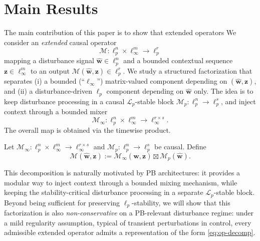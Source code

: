 \documentclass[journal,twoside,web]{ieeecolor}
\newcommand{\disturbance}{\mathbf{\widehat w}}
\newcommand{\operator}{\mathcal{M}}
\begin{document}

\section{Main Results}
The main contribution of this paper is to show that extended operators
We consider an \emph{extended} causal operator
\[
\operator:\ell_p^n\times \ell_\infty^m\to \ell_p^r
\]
mapping a disturbance signal \(\disturbance\in\ell_p^n\) and a bounded contextual sequence
\(\mathbf z\in\ell_\infty^m\) to an output \(\operator(\disturbance,\mathbf z)\in\ell_p^r\).
We study a structured factorization that separates
(i) a bounded (``\(\ell_\infty\)'') matrix-valued component depending on \((\disturbance,\mathbf z)\),
and
(ii) a disturbance-driven \(\ell_p\) component depending on \(\disturbance\) only.
The idea is to keep disturbance processing in a causal
\(\mathcal L_p\)-stable block \(\operator_p:\ell_p^n\to\ell_p^s\), and inject context through a bounded
mixer
\[
\operator_\infty:\ell_p^n\times \ell_\infty^m\to \ell_\infty^{r\times s}.
\]
The overall map is obtained via the timewise product.

Let \(\operator_\infty:\ell_p^n\times \ell_\infty^m\to \ell_\infty^{r\times s}\)
and \(\operator_p:\ell_p^n\to \ell_p^{s}\) be causal. Define
\begin{equation}\label{eq:op-decomp}
\operator(\disturbance,\mathbf z)
:= \operator_\infty(\disturbance,\mathbf z)\boxtimes \operator_p(\disturbance).
\end{equation}

This decomposition is naturally motivated by PB architectures: it provides a modular way to inject
context through a bounded mixing mechanism, while keeping the stability-critical disturbance
processing in a separate \(\mathcal L_p\)-stable block. Beyond being sufficient for preserving
\(\ell_p\)-stability, we will show that this factorization is also \emph{non-conservative} on a
PB-relevant disturbance regime: under a mild regularity assumption, typical of transient perturbations
in control, every admissible extended operator admits a representation of the form
\eqref{eq:op-decomp}.
\end{document}
